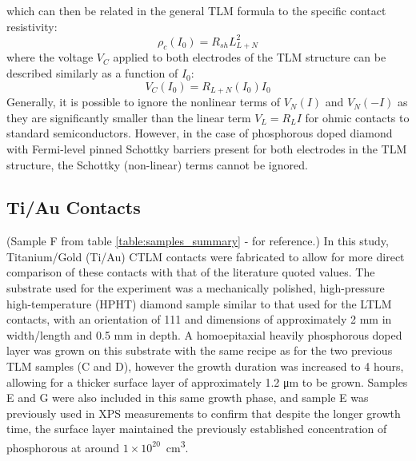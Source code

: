 \begin{refsection}
which can then be related in the general TLM formula to the specific contact resistivity:
\begin{equation}
    \rho_{c}(I_{0}) = R_{sh}L_{L+N}^{2}
    \label{eq:tlm_specific_contact_resistance_transfer_length_L+N}
\end{equation}
where the voltage $V_{C}$ applied to both electrodes of the TLM structure can be described similarly as a function of $I_{0}$:
\begin{equation}
    V_{C}(I_{0}) = R_{L+N}(I_{0})I_{0}
    \label{eq:tlm_voltage_V_C(I_0)}
\end{equation}
Generally, it is possible to ignore the nonlinear terms of $V_{N}(I)$ and $V_{N}(-I)$ as they are significantly smaller than the linear term $V_{L} = R_{L}I$ for ohmic contacts to standard semiconductors. However, in the case of phosphorous doped diamond with Fermi-level pinned Schottky barriers present for both electrodes in the TLM structure, the Schottky (non-linear) terms cannot be ignored.

\subsection{Ti/Au Contacts}
(Sample F from table \ref{table:samples_summary} - for reference.)
In this study, Titanium/Gold (Ti/Au) CTLM contacts were fabricated to allow for more direct comparison of these contacts with that of the literature quoted values. The substrate used for the experiment was a mechanically polished, high-pressure high-temperature (HPHT) diamond sample similar to that used for the LTLM contacts, with an orientation of 111 and dimensions of approximately 2 \si{\milli\metre} in width/length and 0.5 \si{\milli\metre} in depth. A homoepitaxial heavily phosphorous doped layer was grown on this substrate with the same recipe as for the two previous TLM samples (C and D), however the growth duration was increased to 4 hours, allowing for a thicker surface layer of approximately 1.2 \si{\micro\metre} to be grown. Samples E and G were also included in this same growth phase, and sample E was previously used in XPS measurements to confirm that despite the longer growth time, the surface layer maintained the previously established concentration of phosphorous at around $1\times10^{20}$\si{\per\centi\metre\cubed}.


\end{refsection}
